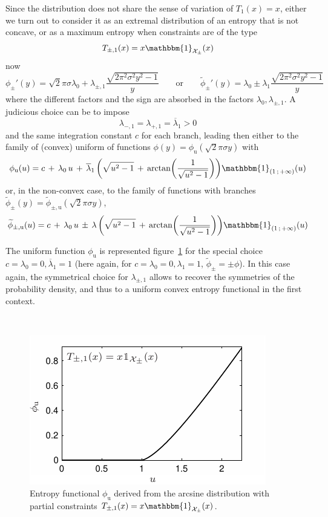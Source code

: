 \documentclass[entropy,article,submit,moreauthors,pdftex]{Definitions/mdpi}
\def\X{\mathcal{X}}
\def\un{\mathbbm{1}}
\begin{document}
Since the distribution  does not share the  sense of variation of  $T_1(x) = x$,
either we turn out to consider it as an extremal distribution of an entropy that
is not concave, or as a maximum entropy when constraints are of the type
%
\[
T_{\pm,1}(x) = x \un_{\X_\pm}(x)
\]
%
now 
%
\[
\phi_\pm'(y) = \sqrt2 \pi \sigma \lambda_0 + \lambda_{\pm,1} \frac{\sqrt{2 \pi^2
    \sigma^2  y^2 -  1}}{y} \qquad  \mbox{or} \qquad  \widetilde{\phi}_\pm'(y) =
\lambda_0 \pm \lambda_1 \frac{\sqrt{2 \pi^2 \sigma^2 y^2 - 1}}{y}
\]
%
where the different factors and the sign are absorbed in the factors $\lambda_0,
\lambda_{\pm,1}$. A judicious choice can be to impose
%
\[
\lambda_{-,1} = \lambda_{+,1} = \overline{\lambda}_1 > 0
\]
%
and the  same integration constant $c$  for each branch, leading  then either to
the family of (convex) uniform  of functions $\phi(y) = \phi_{\mathrm{u}}(\sqrt2
\pi \sigma y)$ with
%
\[
\phi_{\mathrm{u}}(u) = c \, + \, \lambda_0  \, u \, + \, \overline{\lambda}_1 \,
\left( \sqrt{u^2  - 1} \,  + \,  \arctan\left( \frac{1}{\sqrt{u^2 -  1}} \right)
\right) \un_{\left( 1 \, ; \, +\infty \right)}(u)
\]
%
or,  in  the  non-convex  case,  to   the  family  of  functions  with  branches
$\widetilde{\phi}_{\pm}(y) = \widetilde{\phi}_{\pm,\mathrm{u}}(\sqrt2 \pi \sigma
y)$,
%
\[
\widetilde{\phi}_{\pm,\mathrm{u}}(u)  = c  \,  + \,  \lambda_0 \,  u  \, \pm  \,
\lambda \, \left( \sqrt{u^2 - 1}  \, + \, \arctan\left( \frac{1}{\sqrt{u^2 - 1}}
\right) \right) \un_{\left( 1 \, ; \, +\infty \right)}(u)
\]


The      uniform      function      $\phi_{\mathrm{u}}$      is      represented
figure~\ref{fig:Entropy-arcsin}  for the  special  choice $c  =  \lambda_0 =  0,
\overline{\lambda}_1 = 1$ (here  again, for $c = \lambda_0 =  0, \lambda_1 = 1$,
$\widetilde{\phi}_\pm = \pm \phi$).  In  this case again, the symmetrical choice
for  $\lambda_{\pm,1}$  allows to  recover  the  symmetries of  the  probability
density, and thus to a uniform convex entropy functional in the first context.

\
 
\begin{figure}[htbp]
\centerline{\includegraphics[width=.39\textwidth]{PDF/MaxEnt_ArcsineLaw}}
\caption{Entropy  functional   $\phi_{\mathrm{u}}$  derived  from   the  arcsine
  distribution with partial constraints $T_{\pm,1}(x) = x \un_{\X_\pm}(x)$.}
\label{fig:Entropy-arcsin}
\end{figure}
\end{document}
